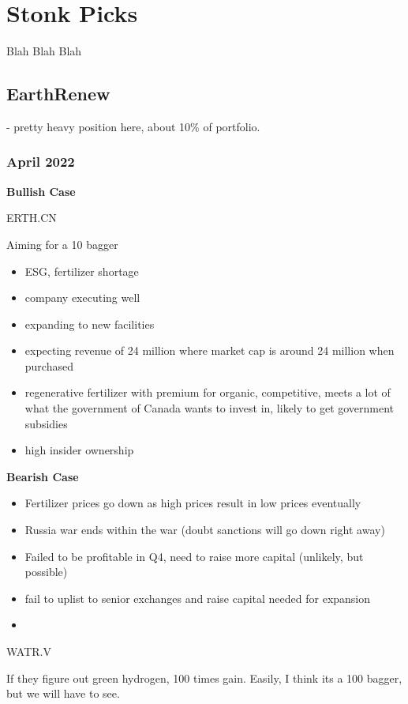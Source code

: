 \chapter{Stonk Picks}

Blah Blah Blah


\section{EarthRenew}

- pretty heavy position here, about 10\% of portfolio.

\subsection{April 2022}

\textbf{Bullish Case}

ERTH.CN

Aiming for a 10 bagger
\begin{itemize}
    \item ESG, fertilizer shortage
    \item company executing well
    \item expanding to new facilities
    \item expecting revenue of 24 million where market cap is around 24 million when purchased
    \item regenerative fertilizer with premium for organic, competitive, meets a lot of what the government of Canada wants to invest in, likely to get government subsidies
    \item high insider ownership
\end{itemize}

\textbf{Bearish Case}

\begin{itemize}
    \item Fertilizer prices go down as high prices result in low prices eventually
    \item Russia war ends within the war (doubt sanctions will go down right away)
    \item Failed to be profitable in Q4, need to raise more capital (unlikely, but possible)
    \item fail to uplist to senior exchanges and raise capital needed for expansion
    \item 
\end{itemize}


WATR.V 

If they figure out green hydrogen, 100 times gain. Easily, I think its a 100 bagger, but we will have to see.